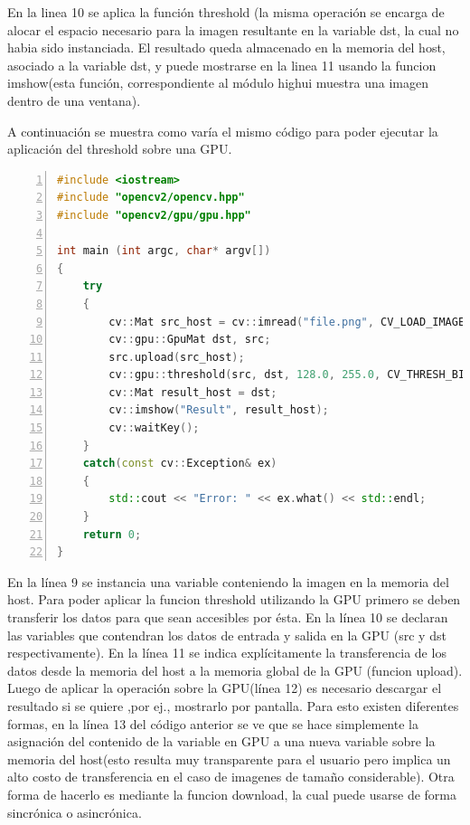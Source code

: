 \documentclass[a4paper,10pt]{report}
\begin{document}
En la linea 10 se aplica la función threshold  (la misma operación se encarga de alocar el espacio necesario para la imagen resultante en la variable dst, la cual no habia sido instanciada.
El resultado queda almacenado en la memoria del host, asociado a la variable dst, y puede mostrarse en la linea 11 usando la funcion imshow(esta función, correspondiente al módulo highui muestra una imagen dentro de una ventana).

A continuación se muestra como varía el mismo código para poder ejecutar la aplicación del threshold sobre una GPU.

\begin{lstlisting}[frame=bt,title={aa},caption={Aplicar threshold a imagen en gris - GPU},
columns=fullflexible,numbers=left,backgroundcolor=\color{LemonChiffon1},basicstyle=\footnotesize,keywordstyle=\ttfamily\footnotesize,language=C++,stringstyle=\ttfamily,breaklines=true,xleftmargin=0.5em,xrightmargin=0pt,aboveskip=\bigskipamount,belowskip=\bigskipamount]
#include <iostream>
#include "opencv2/opencv.hpp"
#include "opencv2/gpu/gpu.hpp"

int main (int argc, char* argv[])
{
    try
    {
        cv::Mat src_host = cv::imread("file.png", CV_LOAD_IMAGE_GRAYSCALE);
        cv::gpu::GpuMat dst, src;
        src.upload(src_host);
        cv::gpu::threshold(src, dst, 128.0, 255.0, CV_THRESH_BINARY);
        cv::Mat result_host = dst;
        cv::imshow("Result", result_host);
        cv::waitKey();
    }
    catch(const cv::Exception& ex)
    {
        std::cout << "Error: " << ex.what() << std::endl;
    }
    return 0;
}

\end{lstlisting}

En la línea 9 se instancia una variable conteniendo la imagen en la memoria del host. Para poder aplicar la funcion threshold utilizando la GPU primero se deben transferir los datos para que sean accesibles por ésta.
En la línea 10 se declaran las variables que contendran los datos de entrada y salida en la GPU (src y dst respectivamente).
En la línea 11 se indica explícitamente la transferencia de los datos desde la memoria del host a la memoria global de la GPU (funcion upload). 
Luego de aplicar la operación sobre la GPU(línea 12) es necesario descargar el resultado si se quiere ,por ej., mostrarlo por pantalla. 
Para esto existen diferentes formas, en la línea 13 del código anterior se ve que se hace simplemente la asignación del contenido de la variable en GPU a una nueva variable sobre la memoria del host(esto resulta muy transparente para el usuario pero implica un alto costo de transferencia en el caso de imagenes de tamaño considerable).
Otra forma de hacerlo es mediante la funcion download, la cual puede usarse de forma sincrónica o asincrónica.
\end{document}
